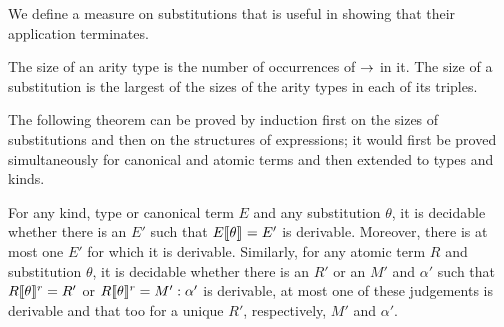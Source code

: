 
    

We define a measure on substitutions that is useful in showing that
their application terminates. 

\begin{definition}\label{def:typesubsize}
The size of an arity type is the number of occurrences of $\rightarrow$ in
it. The size of a substitution is the largest of the sizes of the arity types
in each of its triples.
\end{definition}

The following theorem can be proved by induction first on
the sizes of substitutions and then on the structures of expressions;
it would first be proved simultaneously for canonical and atomic terms
and then extended to types and kinds. 
%
\begin{theorem}\label{th:uniqueness}
For any kind, type or canonical term $E$ and any substitution
$\theta$, it is decidable whether there is an $E'$ such that
$E\llbracket {\theta} \rrbracket_{} = E'$ is derivable.
%
Moreover, there is at most one $E'$ for which it is derivable.
%
Similarly, for any atomic term $R$ and substitution $\theta$, it is
decidable whether there is an $R'$ or an $M'$ and $\alpha'$ such
that $R\llbracket {\theta} \rrbracket^r_{} = R'$ or $R\llbracket {\theta} \rrbracket^r_{} = M' : \alpha'$ is
derivable, at most one of these judgements is derivable and that too
for a unique $R'$, respectively, $M'$ and $\alpha'$. 
\end{theorem}

